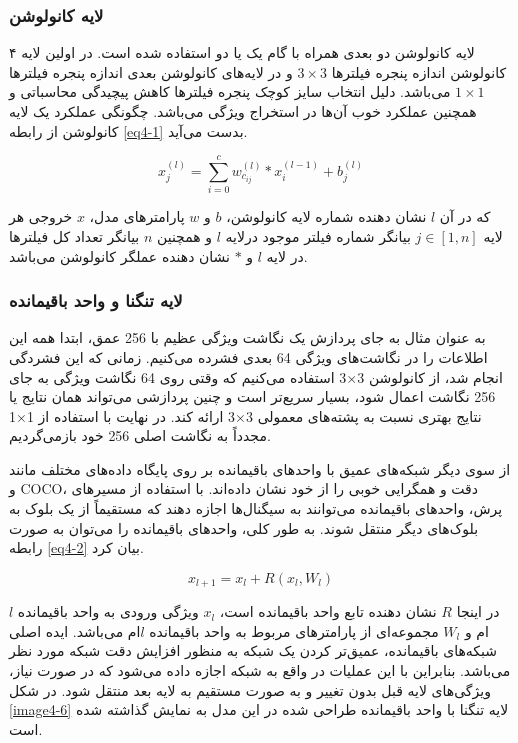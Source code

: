 \subsubsection{لایه كانولوشن}
۴ لایه کانولوشن دو بعدی همراه با گام   یک یا دو استفاده شده است. در اولین لایه کانولوشن‌ اندازه پنجره فیلترها $3 \times 3$ و در لایه‌های کانولوشن بعدی اندازه پنجره فیلترها $1 \times 1$ می‌باشد. دلیل انتخاب سایز کوچک پنجره فیلترها کاهش پیچیدگی محاسباتی و همچنین عملکرد خوب آن‌ها در استخراج ویژگی می‌باشد. چگونگی عملکرد یک لایه کانولوشن از رابطه \ref{eq4-1} بدست می‌آید.

\begin{equation}	
x_j^{(l)} =\sum_{i=0}^{c} w_{c_{ij}}^{(l)}\ast x_i^{(l-1) }+ b_j^{(l)} 
\label{eq4-1}
\end{equation}

\noindent
که در آن $l$ نشان دهنده شماره لایه کانولوشن، $b$ و $w$ پارامترهای مدل، $x$ خروجی هر لایه $j\in[1,n]$ بیانگر شماره فیلتر موجود درلایه $l$ و همچنین $n$ بیانگر تعداد کل فیلترها در لایه $l$ و $\ast$ نشان دهنده عملگر کانولوشن می‌باشد.

\subsubsection{لایه تنگنا و واحد باقیمانده}
به عنوان مثال به جای پردازش یک نگاشت ویژگی عظیم با 256 عمق، ابتدا همه این اطلاعات را در نگاشت‌های ویژگی 64 بعدی فشرده می‌کنیم. زمانی که این فشردگی انجام شد، از کانولوشن 3×3 استفاده می‌کنیم که وقتی روی 64 نگاشت ویژگی به جای 256 نگاشت اعمال شود، بسیار سریع‌تر است و چنین پردازشی می‌تواند همان نتایج یا نتایج بهتری نسبت به پشته‌های معمولی 3×3 ارائه کند. در نهایت با استفاده از 1×1 مجدداً به نگاشت اصلی 256 خود بازمی‌گردیم.

\noindent
از سوی دیگر شبکه‌های عمیق با واحدهای باقیمانده  بر روی پایگاه داده‌های مختلف مانند   و COCO، دقت و همگرایی خوبی را از خود نشان داده‌اند. با استفاده از مسیرهای پرش، واحدهای باقیمانده می‌توانند به سیگنال‌ها اجازه دهند که مستقیماً از یک بلوک به بلوک‌های دیگر منتقل شوند. به طور کلی، واحدهای باقیمانده را می‌توان به صورت رابطه \ref{eq4-2} بیان کرد.

\begin{equation}
x_{l+1}=x_l+R(x_l ,W_l)
\label{eq4-2}
\end{equation}

\noindent
در اینجا $R$ نشان دهنده تابع واحد باقیمانده است، $x_l$ ویژگی ورودی به واحد باقیمانده $l$ ام و $W_l$ مجموعه‌ای از پارامترهای مربوط به واحد باقیمانده $l$ام می‌باشد. ایده اصلی شبکه‌های باقیمانده، عمیق‌تر کردن یک شبکه به منظور افزایش دقت شبکه مورد نظر می‌باشد. بنابراین با این عملیات در واقع به شبکه اجازه داده می‌شود که در صورت نیاز، ویژگی‌های لایه قبل بدون تغییر و به صورت مستقیم به لایه بعد منتقل شود. در شکل \ref{image4-6} لایه تنگنا با واحد باقیمانده طراحی شده در این مدل به نمایش گذاشته شده است.

